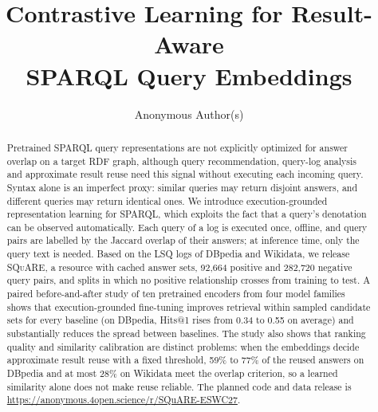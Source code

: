 \documentclass[runningheads]{llncs}
\newcommand{\squareds}{\textsc{SQuARE}}
\begin{document}
\title{Contrastive Learning for Result-Aware\\SPARQL Query Embeddings}


\author{Anonymous Author(s)}

\maketitle

\begin{abstract}
Pretrained SPARQL query representations are not explicitly optimized for
answer overlap on a target RDF graph, although query recommendation,
query-log analysis and approximate result reuse need this signal without
executing each incoming query. Syntax alone is an imperfect proxy: similar queries may return disjoint answers, and different queries may
return identical ones. We introduce execution-grounded representation learning
for SPARQL, which exploits the fact that a query's denotation can be observed
automatically. Each query of a log is executed once, offline, and query pairs
are labelled by the Jaccard overlap of their answers; at inference time, only
the query text is needed. Based on the LSQ logs of DBpedia and Wikidata, we
release \squareds{}, a resource with cached answer sets, 92{,}664 positive and
282{,}720 negative query pairs, and splits in which no positive relationship
crosses from training to test. A paired before-and-after study of ten pretrained encoders from four model families shows that execution-grounded fine-tuning improves retrieval within sampled candidate sets for every baseline (on DBpedia, Hits@1 rises from 0.34 to 0.55 on
average) and substantially reduces the spread between baselines. The study
also shows that ranking quality and similarity calibration are distinct
problems: when the embeddings decide approximate result reuse with a fixed
threshold, 59\% to 77\% of the reused answers on DBpedia and at most 28\% on
Wikidata meet the overlap criterion, so a learned similarity alone does not
make reuse reliable. The planned code and data release is \url{https://anonymous.4open.science/r/SQuARE-ESWC27}.

\end{abstract}
\end{document}
